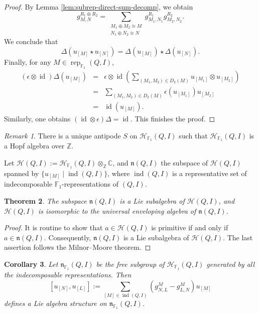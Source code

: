 \documentclass[12pt]{amsart}
\newtheorem{theorem}{Theorem}[section]
\newtheorem{corollary}[theorem]{Corollary}
\theoremstyle{remark}
\newtheorem{remark}[theorem]{Remark}
\theoremstyle{definition}
\numberwithin{equation}{section}
\begin{document}
\begin{proof}
    By Lemma \ref{lem:subrep-direct-sum-decomp}, we obtain 
    \[
    g_{M,N}^{R_1\oplus R_2}=\sum_{\substack{M_1\oplus M_2\cong M\\ N_1\oplus N_2\cong N}}g_{M_1,N_1}^{R_1}g_{M_2,N_2}^{R_2}.
    \]
    We conclude that 
    \[
     \Delta(u_{[{M}]}\star u_{[{N}]})= \Delta(u_{[{M}]})\star\Delta(u_{[{N}]}).
    \]
    Finally, for any ${M}\in \operatorname{rep}_{\mathbb{F}_1}(Q,I)$,
    \begin{eqnarray*}
    (\epsilon\otimes \operatorname{id})\Delta(u_{[{M}]})&=&\epsilon\otimes \operatorname{id}(\sum_{({M}_1,{M}_2)\in D_2({M})} u_{[{M}_1]}\otimes u_{[{M}_2]})\\
    &=&\sum_{({M}_1,{M}_2)\in D_2({M})} \epsilon(u_{[{M}_1]}) u_{[{M}_2]}\\
    &=&\operatorname{id}(u_{[{M}]}).
    \end{eqnarray*}
    Similarly, one obtains $(\operatorname{id}\otimes \epsilon)\Delta= \operatorname{id}$.
    This finishes the proof.
\end{proof}
\begin{remark}
    There is a unique antipode $S$ on $\mathcal{H}_{\mathbb{F}_1}(Q,I)$ such that $\mathcal{H}_{\mathbb{F}_1}(Q,I)$ is a Hopf algebra over $\mathbb{Z}$.
\end{remark}

Let $\mathcal{H}(Q,I):=\mathcal{H}_{\mathbb{F}_1}(Q,I)\otimes_{\mathbb{Z}}\mathbb{C}$, and $\mathfrak{n}(Q,I)$  the subspace of $\mathcal{H}(Q,I)$ spanned by $\{u_{[{M}]}\mid \operatorname{ind}(Q,I)\}$, where $\operatorname{ind}(Q,I)$ is a representative set of indecomposable $\mathbb{F}_1$-representations of $(Q,I)$.
\begin{theorem}\label{thm:enveloping-lie-algebra}
    The subspace $\mathfrak{n}(Q,I)$ is a Lie subalgebra of $\mathcal{H}(Q,I)$, and $\mathcal{H}(Q,I)$ is isomorphic to the universal enveloping algebra of $\mathfrak{n}(Q,I)$.
\end{theorem}
\begin{proof}
   It is routine to show that $a\in \mathcal{H}(Q,I)$ is primitive if and only if $a\in \mathfrak{n}(Q,I)$. Consequently, $\mathfrak{n}(Q,I)$ is a Lie subalgebra of $\mathcal{H}(Q,I)$. The last assertion follows the Milnor--Moore theorem. 
\end{proof}
\begin{corollary}\label{cor:hall-Lie-subalgebra-f1}
    Let $\mathfrak{n}_{\mathbb{F}_1}(Q,I)$ be the free subgroup of $\mathcal{H}_{\mathbb{F}_1}(Q,I)$ generated by all the indecomposable representations. Then \[[u_{[{N}]},u_{[{L}]}]:=\sum_{{[M]}\in \operatorname{ind}(Q,I)}(g_{{N},{L}}^{M}-g_{{L},{N}}^{M})u_{[{M}]}\] defines a Lie algebra structure on $\mathfrak{n}_{\mathbb{F}_1}(Q,I)$.
\end{corollary}
\end{document}

